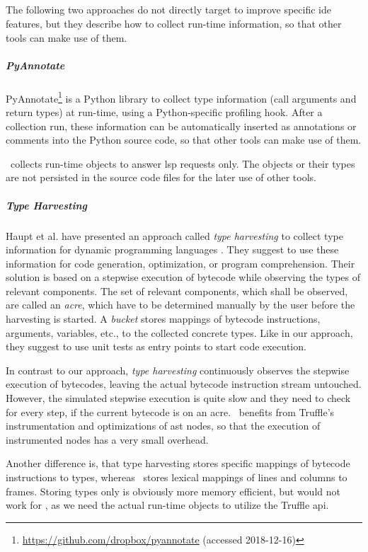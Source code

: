     \subparagraph{}
    The following two approaches do not directly target to improve specific \ac{ide} features, but they describe how to collect run-time information, so that other tools can make use of them. 

    \subparagraph{PyAnnotate}
    PyAnnotate\footnote{\url{https://github.com/dropbox/pyannotate} (accessed 2018-12-16)} is a Python library to collect type information (call arguments and return types) at run-time, using a Python-specific profiling hook. After a collection run, these information can be automatically inserted as annotations or comments into the Python source code, so that other tools can make use of them.

    \graallsp~collects run-time objects to answer \ac{lsp} requests only. The objects or their types are not persisted in the source code files for the later use of other tools.

    \subparagraph{Type Harvesting}
    Haupt et al. have presented an approach called \emph{type harvesting} to collect type information for dynamic programming languages \cite{haupt2011type}. They suggest to use these information for code generation, optimization, or program comprehension. Their solution is based on a stepwise execution of bytecode while observing the types of relevant components. The set of relevant components, which shall be observed, are called an \emph{acre}, which have to be determined manually by the user before the harvesting is started. A \emph{bucket} stores mappings of bytecode instructions, arguments, variables, etc., to the collected concrete types. Like in our approach, they suggest to use unit tests as entry points to start code execution.

    In contrast to our approach, \emph{type harvesting} continuously observes the stepwise execution of bytecodes, leaving the actual bytecode instruction stream untouched. However, the simulated stepwise execution is quite slow and they need to check for every step, if the current bytecode is on an acre. \graallsp~benefits from Truffle's instrumentation and optimizations of \ac{ast} nodes, so that the execution of instrumented nodes has a very small overhead.

    Another difference is, that type harvesting stores specific mappings of bytecode instructions to types, whereas \graallsp~stores lexical mappings of lines and columns to frames. Storing types only is obviously more memory efficient, but would not work for \graallsp, as we need the actual run-time objects to utilize the Truffle \ac{api}. 


